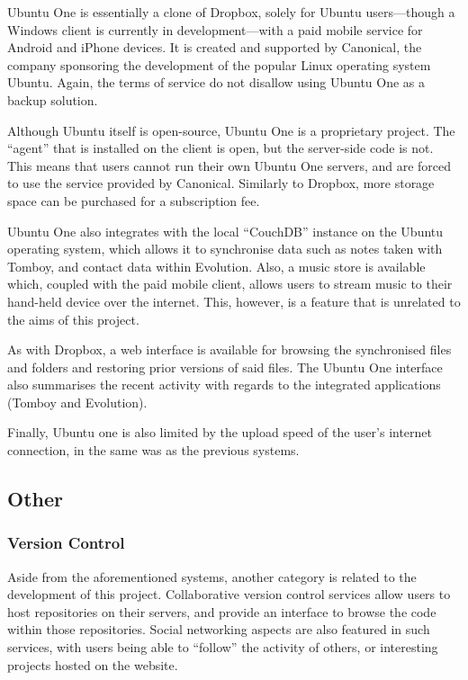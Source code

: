 Ubuntu One is essentially a clone of Dropbox, solely for Ubuntu users---though
a Windows client is currently in development---with a paid mobile service for
Android and iPhone devices\cite{UbuntuOne}. It is created and supported by
Canonical, the company sponsoring the development of the popular Linux
operating system Ubuntu\cite{UbuntuOne}. Again, the terms of service do not
disallow using Ubuntu One as a backup solution\cite{UbuntuOne-terms}.

Although Ubuntu itself is open-source, Ubuntu One is a proprietary project. The
``agent'' that is installed on the client is open, but the server-side code is
not\cite{UbuntuOne-servers}. This means that users cannot run their own Ubuntu
One servers, and are forced to use the service provided by Canonical. Similarly
to Dropbox, more storage space can be purchased for a subscription
fee\cite{UbuntuOne}.

Ubuntu One also integrates with the local ``CouchDB'' instance on the Ubuntu
operating system, which allows it to synchronise data such as notes taken with
Tomboy, and contact data within Evolution\cite{UbuntuOne-couchdb}. Also,
a music store is available which, coupled with the paid mobile client, allows
users to stream music to their hand-held device over the
internet\cite{UbuntuOne}. This, however, is a feature that is unrelated to the
aims of this project.

As with Dropbox, a web interface is available for browsing the synchronised
files and folders and restoring prior versions of said files. The Ubuntu One
interface also summarises the recent activity with regards to the integrated
applications (Tomboy and Evolution)\cite{UbuntuOne}.

Finally, Ubuntu one is also limited by the upload speed of the user's internet
connection, in the same was as the previous systems.

\subsection{Other}

\subsubsection{Version Control}

Aside from the aforementioned systems, another category is related to the
development of this project. Collaborative version control services allow users
to host repositories on their servers, and provide an interface to browse the
code within those repositories. Social networking aspects are also featured in
such services, with users being able to ``follow'' the activity of others, or
interesting projects hosted on the website.

